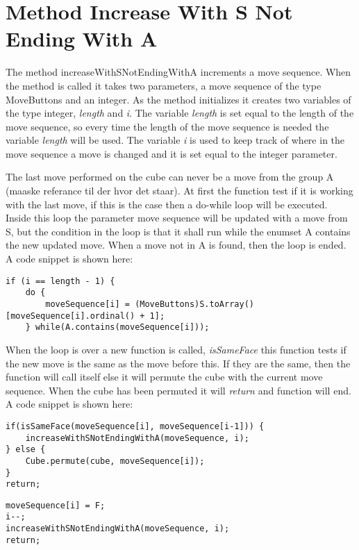 \section{Method Increase With S Not Ending With A}

The method increaseWithSNotEndingWithA increments a move sequence. When the method is called it takes two parameters, a move sequence of the type MoveButtons and an integer. As the method initializes it creates two variables of the type integer, \textit{length} and \textit{i}. The variable \textit{length} is set equal to the length of the move sequence, so every time the length of the move sequence is needed the variable \textit{length} will be used. The variable \textit{i} is used to keep track of where in the move sequence a move is changed and it is set equal to the integer parameter. 

The last move performed on the cube can never be a move from the group A (maaske referance til der hvor det staar). At first the function test if it is working with the last move, if this is the case then a do-while loop will be executed. Inside this loop the parameter move sequence will be updated with a move from S, but the condition in the loop is that it shall run while the enumset A contains the new updated move. When a move not in A is found, then the loop is ended. A code snippet is shown here:

\begin{verbatim}
if (i == length - 1) {
	do {
		moveSequence[i] = (MoveButtons)S.toArray()[moveSequence[i].ordinal() + 1];
	} while(A.contains(moveSequence[i]));
\end{verbatim}

When the loop is over a new function is called, \textit{isSameFace} this function tests if the new move is the same as the move before this. If they are the same, then the function will call itself else it will permute the cube with the current move sequence. When the cube has been permuted it will \textit{return} and function will end. A code snippet is shown here:

\begin{verbatim}
if(isSameFace(moveSequence[i], moveSequence[i-1])) {
	increaseWithSNotEndingWithA(moveSequence, i);
} else {
	Cube.permute(cube, moveSequence[i]);
}
return;
\end{verbatim}



\begin{verbatim}
moveSequence[i] = F;
i--;
increaseWithSNotEndingWithA(moveSequence, i);
return;
\end{verbatim}




